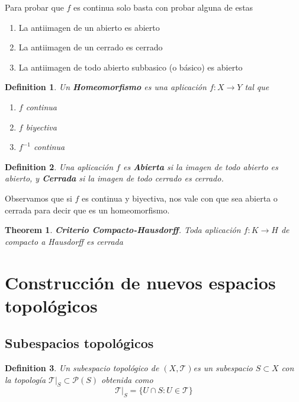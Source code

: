 \documentclass[leqno]{article}
\newtheorem*{definition}{Definition}
\newtheorem*{theorem}{Theorem}
\begin{document}
Para probar que $f$ es continua solo basta con probar alguna de estas
 \begin{enumerate}[topsep=-6pt, itemsep=0pt]
  \item La antiimagen de un abierto es abierto
  \item La antiimagen de un cerrado es cerrado
	\item La antiimagen de todo abierto subbasico (o básico) es abierto
\end{enumerate}

\begin{definition}
Un \textbf{Homeomorfismo} es una aplicación $f: X \to Y$ tal que
\begin{enumerate}[topsep=-6pt, itemsep=0pt]
  \item $f$ continua
  \item  $f$ biyectiva
  \item  $f^{-1}$ continua
\end{enumerate}
\end{definition}

\begin{definition}
Una aplicación $f$ es \textbf{Abierta} si la imagen de todo abierto es abierto, y \textbf{Cerrada} si la imagen de todo cerrado es cerrado.
\end{definition}

Observamos que si $f$ es continua y biyectiva, nos vale con que sea abierta o cerrada para decir que es un homeomorfismo.

\begin{theorem}
\textbf{Criterio Compacto-Hausdorff}. Toda aplicación $f:K\to H$ de compacto a Hausdorff es cerrada
\end{theorem}


\section{Construcción de nuevos espacios topológicos}

\subsection{Subespacios topológicos}
\begin{definition}
Un subespacio topológico de $(X, \mathcal{T})$es un subespacio $S\subset X$ con la topología $\mathcal{T}|_S\subset \mathcal{P}(S)$ obtenida como
\[
\mathcal{T}|_S = \{U\cap S: U\in \mathcal{T}\}
\] 
\end{definition}
\end{document}
